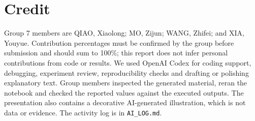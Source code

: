 \documentclass{article}
\begin{document}
\section*{Credit}
Group 7 members are QIAO, Xiaolong; MO, Zijun; WANG, Zhifei; and XIA, Youyue. Contribution percentages must be confirmed by the group before submission and should sum to 100\%; this report does not infer personal contributions from code or results. We used OpenAI Codex for coding support, debugging, experiment review, reproducibility checks and drafting or polishing explanatory text. Group members inspected the generated material, reran the notebook and checked the reported values against the executed outputs. The presentation also contains a decorative AI-generated illustration, which is not data or evidence. The activity log is in \texttt{AI\_LOG.md}.
\end{document}

